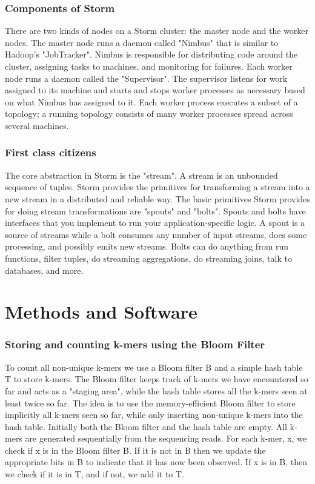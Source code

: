 \documentclass[11pt]{article}
\begin{document}
\subsubsection{Components of Storm}
There are two kinds of nodes on a Storm cluster: the master node and the worker nodes. The master node runs a daemon called "Nimbus" that is similar to Hadoop's "JobTracker". Nimbus is responsible for distributing code around the cluster, assigning tasks to machines, and monitoring for failures. Each worker node runs a daemon called the "Supervisor". The supervisor listens for work assigned to its machine and starts and stops worker processes as necessary based on what Nimbus has assigned to it. Each worker process executes a subset of a topology; a running topology consists of many worker processes spread across several machines. 
\subsubsection{First class citizens}
The core abstraction in Storm is the "stream". A stream is an unbounded sequence of tuples. Storm provides the primitives for transforming a stream into a new stream in a distributed and reliable way. The basic primitives Storm provides for doing stream transformations are "spouts" and "bolts". Spouts and bolts have interfaces that you implement to run your application-specific logic. A spout is a source of streams while a bolt consumes any number of input streams, does some processing, and possibly emits new streams. Bolts can do anything from run functions, filter tuples, do streaming aggregations, do streaming joins, talk to databases, and more.

\section{Methods and Software}
\subsubsection{Storing and counting k-mers using the Bloom Filter}
To count all non-unique k-mers we use a Bloom filter B and a simple hash table T to store k-mers. The Bloom filter keeps track of k-mers we have encountered so far and acts as a "staging area", while the hash table stores all the k-mers seen at least twice so far. The idea is to use the memory-efficient Bloom filter to store implicitly all k-mers seen so far, while only inserting non-unique k-mers into the hash table. Initially both the Bloom filter and the hash table are empty. All k-mers are generated sequentially from the sequencing reads. For each k-mer, x, we check if x is in the Bloom filter B. If it is not in B then we update the appropriate bits in B to indicate that it has now been observed. If x is in B, then we check if it is in T, and if not, we add it to T.
\end{document}
